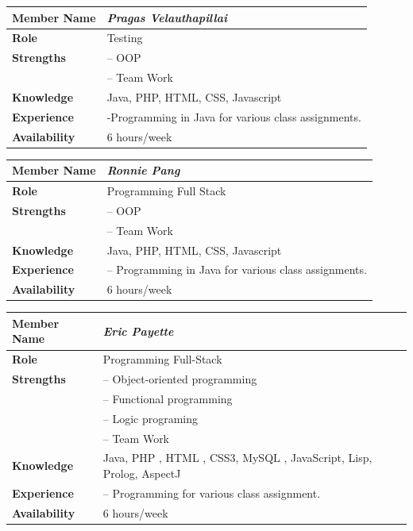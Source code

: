 \documentclass[12pt]{article}
\begin{document}
%
\vspace{3mm}
%
\begin{center}
\begin{tabular}{ p{2.7cm} | p{9cm} }
\hline
\textbf{Member Name}	&	\textit{\textbf{Pragas Velauthapillai}}	\\ \hline \hline
\textbf{Role}		&	Testing	\\ \hline
\textbf{Strengths}	&	-- OOP	\\
					&	-- Team Work	\\ \hline
\textbf{Knowledge}	&	Java, PHP, HTML, CSS, Javascript	\\ \hline
\textbf{Experience}	&	-Programming in Java for various class assignments.	\\ \hline
\textbf{Availability}	&	6 hours/week	\\ \hline
\end{tabular}
\end{center}
%
\vspace{3mm}
%
\begin{center}
\begin{tabular}{ p{2.7cm} | p{9cm} }
\hline
\textbf{Member Name}	&	\textit{\textbf{Ronnie Pang}}	\\ \hline \hline
\textbf{Role}		&	Programming Full Stack	\\ \hline
\textbf{Strengths}	&	-- OOP	\\
					&	-- Team Work	\\ \hline
\textbf{Knowledge}	&	Java, PHP, HTML, CSS, Javascript	\\ \hline
\textbf{Experience}	&	-- Programming in Java for various class assignments.	\\ \hline
\textbf{Availability}	&	6 hours/week	\\ \hline
\end{tabular}
\end{center}
%
\vspace{3mm}
%
\begin{center}
\begin{tabular}{ p{2.7cm} | p{9cm} }
\hline
\textbf{Member Name}	&	\textit{\textbf{Eric Payette}}	\\ \hline \hline
\textbf{Role}		&	Programming Full-Stack	\\ \hline
\textbf{Strengths}	&	-- Object-oriented programming	\\
					&	-- Functional programming	\\
					&	-- Logic programing	\\
					&	-- Team Work	\\ \hline
\textbf{Knowledge}	&	Java, PHP , HTML , CSS3, MySQL , JavaScript, Lisp, Prolog, AspectJ	\\ \hline
\textbf{Experience}	&	-- Programming for various class assignment.	\\ \hline
\textbf{Availability}	&	6 hours/week	\\ \hline
\end{tabular}
\end{center}
\end{document}
